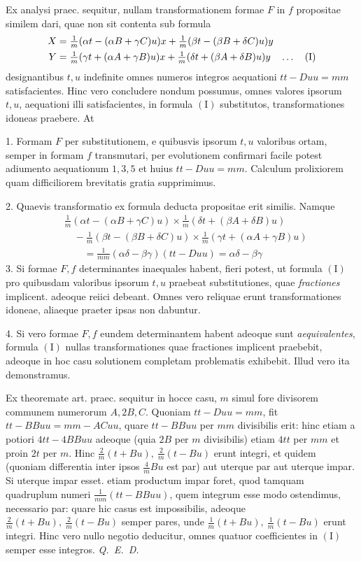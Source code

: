 Ex analysi praec. sequitur, nullam transformationem formae \(F\) in \(f\) propositae similem dari, quae non sit contenta sub formula
\[
\begin{aligned}
X&=\tfrac{1}{m}(\alpha t-(\alpha B+\gamma C)u)x+\tfrac{1}{m}(\beta t-(\beta B+\delta C)u)y\\
Y&=\tfrac{1}{m}(\gamma t+(\alpha A+\gamma B)u)x+\tfrac{1}{m}(\delta t+(\beta A+\delta B)u)y\quad\mathinner{.\,.\,.}\quad(\mathrm{I})
\end{aligned}
\]
designantibus \(t,u\) indefinite omnes numeros integros aequationi \(tt-Duu=mm\) satisfacientes. Hinc vero concludere nondum possumus, omnes valores ipsorum \(t,u\), aequationi illi satisfacientes, in formula \((\mathrm{I})\) substitutos, transformationes idoneas praebere. At

1. Formam \(F\) per substitutionem, e quibusvis ipsorum \(t,u\) valoribus ortam, semper in formam \(f\) transmutari, per evolutionem confirmari facile potest adiumento aequationum \(1,3,5\) et huius \(tt-Duu=mm\). Calculum prolixiorem quam difficiliorem brevitatis gratia supprimimus.

2. Quaevis transformatio ex formula deducta propositae erit similis. Namque
\[
\begin{aligned}
&\tfrac{1}{m}(\alpha t-(\alpha B+\gamma C)u)\times\tfrac{1}{m}(\delta t+(\beta A+\delta B)u)\\
&\quad-\tfrac{1}{m}(\beta t-(\beta B+\delta C)u)\times\tfrac{1}{m}(\gamma t+(\alpha A+\gamma B)u)\\
&\qquad=\tfrac{1}{mm}(\alpha\delta-\beta\gamma)(tt-Duu)=\alpha\delta-\beta\gamma
\end{aligned}
\]
3. Si formae \(F,f\) determinantes inaequales habent, fieri potest, ut formula \((\mathrm{I})\) pro quibusdam valoribus ipsorum \(t,u\) praebeat substitutiones, quae \textit{fractiones} implicent. adeoque reiici debeant. Omnes vero reliquae erunt transformationes idoneae, aliaeque praeter ipsas non dabuntur.

4. Si vero formae \(F,f\) eundem determinantem habent adeoque sunt \textit{aequivalentes}, formula \((\mathrm{I})\) nullas transformationes quae fractiones implicent praebebit, adeoque in hoc casu solutionem completam problematis exhibebit. Illud vero ita demonstramus.

Ex theoremate art. praec. sequitur in hocce casu, \(m\) simul fore divisorem communem numerorum \(A,2B,C\). Quoniam \(tt-Duu=mm\), fit \(tt-BBuu=mm-ACuu\), quare \(tt-BBuu\) per \(mm\) divisibilis erit: hinc etiam a potiori \(4tt-4BBuu\) adeoque (quia \(2B\) per \(m\) divisibilis) etiam \(4tt\) per \(mm\) et proin \(2t\) per \(m\). Hinc \(\frac{2}{m}(t+Bu),\ \frac{2}{m}(t-Bu)\) erunt integri, et quidem (quoniam differentia inter ipsos \(\frac{4}{m}Bu\) est par) aut uterque par aut uterque impar. Si uterque impar esset. etiam productum impar foret, quod tamquam quadruplum numeri \(\frac{1}{mm}(tt-BBuu)\), quem integrum esse modo ostendimus, necessario par: quare hic casus est impossibilis, adeoque \(\frac{2}{m}(t+Bu),\ \frac{2}{m}(t-Bu)\) semper pares, unde \(\frac{1}{m}(t+Bu),\ \frac{1}{m}(t-Bu)\) erunt integri. Hinc vero nullo negotio deducitur, omnes quatuor coefficientes in \((\mathrm{I})\) semper esse integros. \mbox{\textit{Q. E. D.}}

